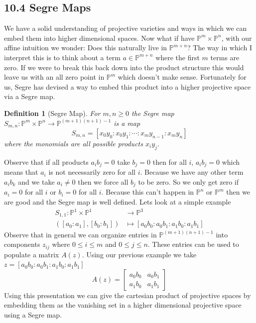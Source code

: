 \documentclass[40pt]{article}
\newtheorem{definition}{Definition}[section]
\newcommand{\Proj}{\mathbb{P}}
\theoremstyle{remark}
\begin{document}
				\subsection{10.4 Segre Maps}
			We have a solid understanding of projective varieties and ways in which we can embed them into higher dimensional spaces. Now what if have $\Proj^m \times \Proj^n$, with our affine intuition we wonder: Does this naturally live in $\Proj^{m+n}$? The way in which I interpret this is to think about a term $a \in \Proj^{m+n}$ where the first $m$ terms are zero. If we were to break this back down into the product structure this would leave us with an all zero point in $\Proj^m$ which doesn't make sense. Fortunately for us, Segre has devised a way to embed this product into a higher projective space via a Segre map.
			\begin{definition}[Segre Map]
				For $m , n \geq 0$ the Segre map $S_{m,n} : \Proj^m \times \Proj^n \rightarrow \Proj^{(m+1)(n+1) - 1}$ is a map 
				\[
				S_{m,n} = [x_0y_0 : x_0y_1: \cdots : x_my_{n-1} : x_my_{n}]
				\]
				where the monomials are all possible products $x_iy_j$.
			\end{definition}
			Observe that if all products $a_ib_j = 0$ take $b_j = 0$ then for all $i$, $a_ib_j = 0$ which means that $a_i$ is not necessarily zero for all $i$. Because we have any other term $a_ib_k$ and we take $a_i \neq 0$ then we force all $b_j$ to be zero. So we only get zero if $a_i = 0$ for all $i$ or $b_i = 0$ for all $i$. Because this can't happen in $\Proj^n$ or $\Proj^m$ then we are good and the Segre map is well defined. Lets look at a simple example 
			\begin{align}
				S_{1,1} : \Proj^1 \times \Proj^1 &\to \Proj^3 \\
				([a_0:a_1], [b_0:b_1]) &\mapsto [a_0b_0 : a_0b_1 : a_1b_0 : a_1b_1]
			\end{align}
			Observe that in general we can organize entries in $\Proj^{(m+1)(n+1) - 1}$ into components $z_{ij}$ where $ 0\leq i \leq m$ and $0 \leq j \leq n$. These entries can be used to populate a matrix $A(z)$. Using our previous example we take $z = [a_0b_0 : a_0b_1 : a_1b_0 : a_1b_1]$
			\[
			A(z) = \begin{bmatrix}
				a_0b_0 & a_0b_1 \\
				a_1b_0 & a_1b_1
			\end{bmatrix}
			\]
			Using this presentation we can give the cartesian product of projective spaces by embedding them as the vanishing set in a higher dimensional projective space using a Segre map.
\end{document}

